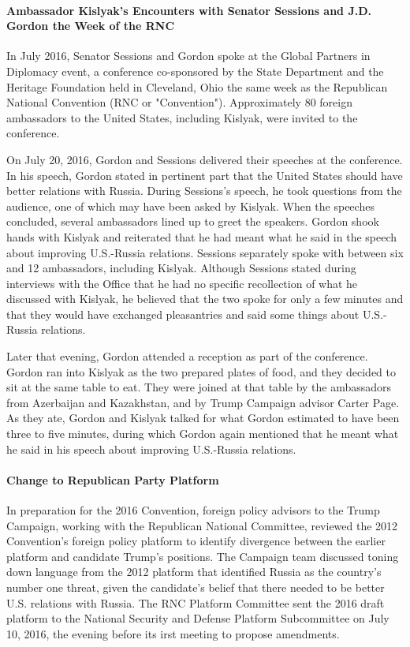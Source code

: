 \paragraph{Ambassador Kislyak's Encounters with Senator Sessions and J.D. Gordon the Week of the RNC}

In July 2016, Senator Sessions and Gordon spoke at the Global Partners in Diplomacy event, a conference co-sponsored by the State Department and the Heritage Foundation held in Cleveland, Ohio the same week as the Republican National Convention (RNC or "Convention").%
Approximately 80 foreign ambassadors to the United States, including Kislyak, were invited to the conference.%

On July 20, 2016, Gordon and Sessions delivered their speeches at the conference.%
In his speech, Gordon stated in pertinent part that the United States should have better relations with Russia.%
During Sessions's speech, he took questions from the audience, one of which may have been asked by Kislyak.%
When the speeches concluded, several ambassadors lined up to greet the speakers.%
Gordon shook hands with Kislyak and reiterated that he had meant what he said in the speech about improving U.S.-Russia relations.%
Sessions separately spoke with between six and 12 ambassadors, including Kislyak.%
Although Sessions stated during interviews with the Office that he had no specific recollection of what he discussed with Kislyak, he believed that the two spoke for only a few minutes and that they would have exchanged pleasantries and said some things about U.S.-Russia relations.%

Later that evening, Gordon attended a reception as part of the conference.%
Gordon ran into Kislyak as the two prepared plates of food, and they decided to sit at the same table to eat.%
They were joined at that table by the ambassadors from Azerbaijan and Kazakhstan, and by Trump Campaign advisor Carter Page.%
As they ate, Gordon and Kislyak talked for what Gordon estimated to have been three to five minutes, during which Gordon again mentioned that he meant what he said in his speech about improving U.S.-Russia relations.%

\paragraph{Change to Republican Party Platform}

In preparation for the 2016 Convention, foreign policy advisors to the Trump Campaign, working with the Republican National Committee, reviewed the 2012 Convention's foreign policy platform to identify divergence between the earlier platform and candidate Trump's positions.%
The Campaign team discussed toning down language from the 2012 platform that identified Russia as the country's number one threat, given the candidate's belief that there needed to be better U.S. relations with Russia.%
The RNC Platform Committee sent the 2016 draft platform to the National Security and Defense Platform Subcommittee on July 10, 2016, the evening before its irst meeting to propose amendments.%

